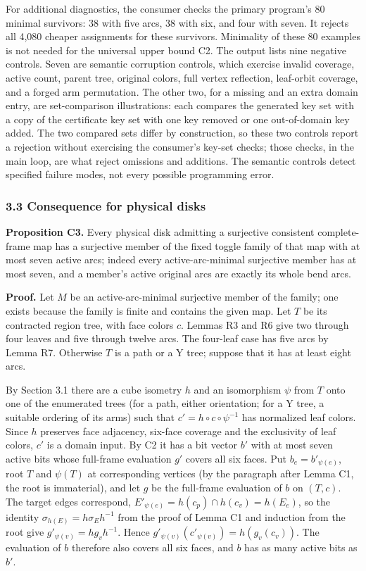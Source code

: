 \documentclass[
  11pt,
]{article}
\begin{document}
For additional diagnostics, the consumer checks the primary program's 80
minimal survivors: 38 with five arcs, 38 with six, and four with seven.
It rejects all 4,080 cheaper assignments for these survivors. Minimality
of these 80 examples is not needed for the universal upper bound C2. The
output lists nine negative controls. Seven are semantic corruption
controls, which exercise invalid coverage, active count, parent tree,
original colors, full vertex reflection, leaf-orbit coverage, and a
forged arm permutation. The other two, for a missing and an extra domain
entry, are set-comparison illustrations: each compares the generated key
set with a copy of the certificate key set with one key removed or one
out-of-domain key added. The two compared sets differ by construction,
so these two controls report a rejection without exercising the
consumer's key-set checks; those checks, in the main loop, are what
reject omissions and additions. The semantic controls detect specified
failure modes, not every possible programming error.

\subsubsection{3.3 Consequence for physical
disks}\label{consequence-for-physical-disks}

\textbf{Proposition C3.} Every physical disk admitting a surjective
consistent complete-frame map has a surjective member of the fixed
toggle family of that map with at most seven active arcs; indeed every
active-arc-minimal surjective member has at most seven, and a member's
active original arcs are exactly its whole bend arcs.

\textbf{Proof.} Let \(M\) be an active-arc-minimal surjective member of
the family; one exists because the family is finite and contains the
given map. Let \(T\) be its contracted region tree, with face colors
\(c\). Lemmas R3 and R6 give two through four leaves and five through
twelve arcs. The four-leaf case has five arcs by Lemma R7. Otherwise
\(T\) is a path or a Y tree; suppose that it has at least eight arcs.

By Section 3.1 there are a cube isometry \(h\) and an isomorphism
\(\psi\) from \(T\) onto one of the enumerated trees (for a path, either
orientation; for a Y tree, a suitable ordering of its arms) such that
\(c'=h\circ c\circ\psi^{-1}\) has normalized leaf colors. Since \(h\)
preserves face adjacency, six-face coverage and the exclusivity of leaf
colors, \(c'\) is a domain input. By C2 it has a bit vector \(b'\) with
at most seven active bits whose full-frame evaluation \(g'\) covers all
six faces. Put \(b_e=b'_{\psi(e)}\), root \(T\) and \(\psi(T)\) at
corresponding vertices (by the paragraph after Lemma C1, the root is
immaterial), and let \(g\) be the full-frame evaluation of \(b\) on
\((T,c)\). The target edges correspond,
\(E'_{\psi(e)}=h(c_p)\cap h(c_v)=h(E_e)\), so the identity
\(\sigma_{h(E)}=h\sigma_Eh^{-1}\) from the proof of Lemma C1 and
induction from the root give \(g'_{\psi(v)}=hg_vh^{-1}\). Hence
\(g'_{\psi(v)}(c'_{\psi(v)})=h(g_v(c_v))\). The evaluation of \(b\)
therefore also covers all six faces, and \(b\) has as many active bits
as \(b'\).
\end{document}
